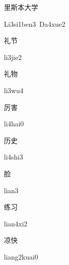 \begin{multicols*}{2}
\begin{verbete}{里斯本大学}
\begin{pronuncia}[\\]{Li3si1ben3\ Da4xue2}
\end{pronuncia}
\end{verbete}

\begin{verbete}[li3jie2]{礼节}
\begin{pronuncia}{li3jie2}
\end{pronuncia}
\end{verbete}

\begin{verbete}[li3wu4]{礼物}
\begin{pronuncia}{li3wu4}
\end{pronuncia}
\end{verbete}

\begin{verbete}[li4hai0]{厉害}
\begin{pronuncia}{li4hai0}
\end{pronuncia}
\end{verbete}

\begin{verbete}[li4shi3]{历史}
\begin{pronuncia}{li4shi3}
\end{pronuncia}
\end{verbete}

\begin{verbete}[lian3]{脸}
\begin{pronuncia}{lian3}
\end{pronuncia}
\end{verbete}

\begin{verbete}[lian4xi2]{练习}
\begin{pronuncia}{lian4xi2}
\end{pronuncia}
\end{verbete}

\begin{verbete}{凉快}
\begin{pronuncia}{liang2kuai0}
\end{pronuncia}
\end{verbete}


\end{multicols*}
